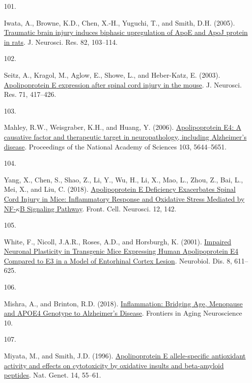 \documentclass[
]{article}
\newlength{\cslhangindent}
\newlength{\csllabelwidth}
\newlength{\cslentryspacingunit} %
\newenvironment{CSLReferences}[2] %
 {%
  \setlength{\parindent}{0pt}
  \ifodd #1
  \let\oldpar\par
  \def\par{\hangindent=\cslhangindent\oldpar}
  \fi
  \setlength{\parskip}{#2\cslentryspacingunit}
 }%
 {}
\newcommand{\CSLLeftMargin}[1]{\parbox[t]{\csllabelwidth}{#1}}
\newcommand{\CSLRightInline}[1]{\parbox[t]{\linewidth - \csllabelwidth}{#1}\break}
\begin{document}
\begin{CSLReferences}{0}{0}
\leavevmode{}%
\CSLLeftMargin{101. }
\CSLRightInline{Iwata, A., Browne, K.D., Chen, X.-H., Yuguchi, T., and Smith, D.H. (2005). \href{https://doi.org/10.1002/jnr.20607}{Traumatic brain injury induces biphasic upregulation of {ApoE} and {ApoJ} protein in rats}. J. Neurosci. Res. 82, 103--114.}

\leavevmode{}%
\CSLLeftMargin{102. }
\CSLRightInline{Seitz, A., Kragol, M., Aglow, E., Showe, L., and Heber-Katz, E. (2003). \href{https://doi.org/10.1002/jnr.10482}{Apolipoprotein {E} expression after spinal cord injury in the mouse}. J. Neurosci. Res. 71, 417--426.}

\leavevmode{}%
\CSLLeftMargin{103. }
\CSLRightInline{Mahley, R.W., Weisgraber, K.H., and Huang, Y. (2006). \href{https://doi.org/10.1073/pnas.0600549103}{Apolipoprotein {E4}: {A} causative factor and therapeutic target in neuropathology, including {Alzheimer}'s disease}. Proceedings of the National Academy of Sciences 103, 5644--5651.}

\leavevmode{}%
\CSLLeftMargin{104. }
\CSLRightInline{Yang, X., Chen, S., Shao, Z., Li, Y., Wu, H., Li, X., Mao, L., Zhou, Z., Bai, L., Mei, X., and Liu, C. (2018). \href{https://doi.org/10.3389/fncel.2018.00142}{Apolipoprotein {E Deficiency Exacerbates Spinal Cord Injury} in {Mice}: {Inflammatory Response} and {Oxidative Stress Mediated} by {NF-\(\kappa\)B Signaling Pathway}}. Front. Cell. Neurosci. 12, 142.}

\leavevmode{}%
\CSLLeftMargin{105. }
\CSLRightInline{White, F., Nicoll, J.A.R., Roses, A.D., and Horsburgh, K. (2001). \href{https://doi.org/10.1006/nbdi.2001.0401}{Impaired {Neuronal Plasticity} in {Transgenic Mice Expressing Human Apolipoprotein E4 Compared} to {E3} in a {Model} of {Entorhinal Cortex Lesion}}. Neurobiol. Dis. 8, 611--625.}

\leavevmode{}%
\CSLLeftMargin{106. }
\CSLRightInline{Mishra, A., and Brinton, R.D. (2018). \href{https://doi.org/10.3389/fnagi.2018.00312}{Inflammation: {Bridging Age}, {Menopause} and {APOE4 Genotype} to {Alzheimer}'s {Disease}}. Frontiers in Aging Neuroscience 10.}

\leavevmode{}%
\CSLLeftMargin{107. }
\CSLRightInline{Miyata, M., and Smith, J.D. (1996). \href{https://doi.org/10.1038/ng0996-55}{Apolipoprotein {E} allele-specific antioxidant activity and effects on cytotoxicity by oxidative insults and beta-amyloid peptides}. Nat. Genet. 14, 55--61.}


\end{CSLReferences}
\end{document}
